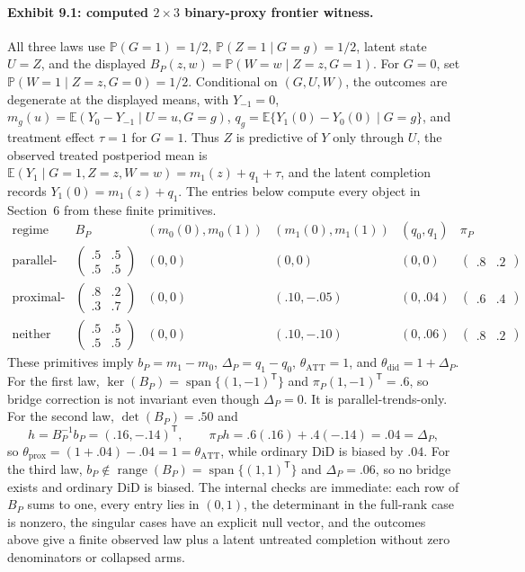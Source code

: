 \documentclass[11pt]{article}
\newcommand{\E}{\mathbb{E}}
\renewcommand{\Pr}{\mathbb{P}}
\newcommand{\transpose}{\mathsf{T}}
\theoremstyle{definition}
\theoremstyle{plain}
\theoremstyle{remark}
\begin{document}
\paragraph{Exhibit 9.1: computed \(2\times3\) binary-proxy frontier witness.}
All three laws use \(\Pr(G=1)=1/2\), \(\Pr(Z=1\mid G=g)=1/2\), latent state \(U=Z\), and the displayed \(B_P(z,w)=\Pr(W=w\mid Z=z,G=1)\).  For \(G=0\), set \(\Pr(W=1\mid Z=z,G=0)=1/2\).  Conditional on \((G,U,W)\), the outcomes are degenerate at the displayed means, with \(Y_{-1}=0\), \(m_g(u)=\E(Y_0-Y_{-1}\mid U=u,G=g)\), \(q_g=\E\{Y_1(0)-Y_0(0)\mid G=g\}\), and treatment effect \(\tau=1\) for \(G=1\).  Thus \(Z\) is predictive of \(Y\) only through \(U\), the observed treated postperiod mean is \(\E(Y_1\mid G=1,Z=z,W=w)=m_1(z)+q_1+\tau\), and the latent completion records \(Y_1(0)=m_1(z)+q_1\).  The entries below compute every object in Section~6 from these finite primitives.
\[
\begin{array}{c|c|c|c|c|c}
\text{regime} & B_P & (m_0(0),m_0(1)) & (m_1(0),m_1(1)) & (q_0,q_1) & \pi_P\\ \hline
\text{parallel-trends-only} &
\begin{pmatrix}.5&.5\\.5&.5\end{pmatrix} &
(0,0) & (0,0) & (0,0) &
\begin{pmatrix}.8&.2\end{pmatrix}\\[1.1em]
\text{proximal-only} &
\begin{pmatrix}.8&.2\\.3&.7\end{pmatrix} &
(0,0) & (.10,-.05) & (0,.04) &
\begin{pmatrix}.6&.4\end{pmatrix}\\[1.1em]
\text{neither} &
\begin{pmatrix}.5&.5\\.5&.5\end{pmatrix} &
(0,0) & (.10,-.10) & (0,.06) &
\begin{pmatrix}.8&.2\end{pmatrix}
\end{array}
\]
These primitives imply \(b_P=m_1-m_0\), \(\Delta_P=q_1-q_0\), \(\theta_{\mathrm{ATT}}=1\), and \(\theta_{\mathrm{did}}=1+\Delta_P\).  For the first law, \(\operatorname{ker}(B_P)=\operatorname{span}\{(1,-1)^\transpose\}\) and \(\pi_P(1,-1)^\transpose=.6\), so bridge correction is not invariant even though \(\Delta_P=0\).  It is parallel-trends-only.  For the second law, \(\det(B_P)=.50\) and
\[
h=B_P^{-1}b_P=(.16,-.14)^\transpose,\qquad
\pi_Ph=.6(.16)+.4(-.14)=.04=\Delta_P,
\]
so \(\theta_{\mathrm{prox}}=(1+.04)-.04=1=\theta_{\mathrm{ATT}}\), while ordinary DiD is biased by \(.04\).  For the third law, \(b_P\notin\operatorname{range}(B_P)=\operatorname{span}\{(1,1)^\transpose\}\) and \(\Delta_P=.06\), so no bridge exists and ordinary DiD is biased.  The internal checks are immediate: each row of \(B_P\) sums to one, every entry lies in \((0,1)\), the determinant in the full-rank case is nonzero, the singular cases have an explicit null vector, and the outcomes above give a finite observed law plus a latent untreated completion without zero denominators or collapsed arms.
\end{document}
